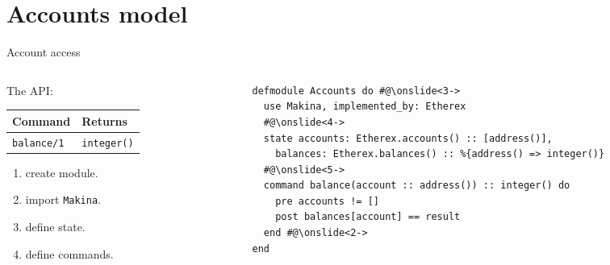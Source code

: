 \documentclass[aspectratio=169, 10pt, handout]{beamer}
\begin{document}
\section{Accounts model}
\label{sec:org14eaa08}
\begin{frame}[label={sec:orgbf2ad66},fragile]{Account access}
 \begin{columns}
\begin{column}{0.28\columnwidth}
\onslide<+->
The API:

\begin{center}
\begin{tabular}{ll}
Command & Returns\\
\hline
\texttt{balance/1} & \texttt{integer()}\\
\end{tabular}
\end{center}
\onslide<+->
\vspace{0.5cm}
\begin{enumerate}
\item create module.
\onslide<+->
\item import \texttt{Makina}.
\onslide<+->
\item define state.
\onslide<+->
\item define commands.
\end{enumerate}
\end{column}

\begin{column}{0.58\columnwidth}
\lstset{language=elixir,label= ,caption= ,captionpos=b,numbers=none,style=display}
\begin{lstlisting}
defmodule Accounts do #@\onslide<3->
  use Makina, implemented_by: Etherex
  #@\onslide<4->
  state accounts: Etherex.accounts() :: [address()],
	balances: Etherex.balances() :: %{address() => integer()}
  #@\onslide<5->
  command balance(account :: address()) :: integer() do
    pre accounts != []
    post balances[account] == result
  end #@\onslide<2->
end
\end{lstlisting}
\end{column}
\end{columns}
\end{frame}
\end{document}
